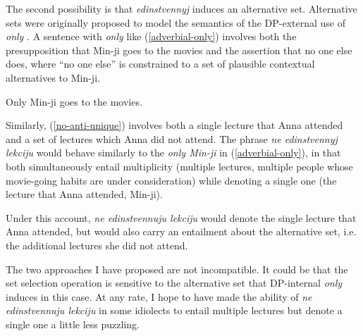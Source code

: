 The second possibility is that \textit{edinstvennyj} induces an alternative set. Alternative sets were originally proposed to model the semantics of the DP-external use of \textit{only} \citep{rooth85, rooth92}.
A sentence with \textit{only} like (\ref{adverbial-only}) involves both the presupposition that Min-ji goes to the movies and the assertion that no one else does, where ``no one else'' is constrained to a set of plausible contextual alternatives to Min-ji.

\begin{exe}
	\ex \label{adverbial-only} Only Min-ji goes to the movies.
\end{exe}

Similarly, (\ref{no-anti-unique}) involves both a single lecture that Anna attended and a set of lectures which Anna did not attend. The phrase \textit{ne edinstvennyj lekciju} would behave similarly to the \textit{only Min-ji} in (\ref{adverbial-only}), in that both simultaneously entail multiplicity (multiple lectures, multiple people whose movie-going habits are under consideration) while denoting a single one (the lecture that Anna attended, Min-ji).

Under this account, \textit{ne edinstvennuju lekciju} would denote the single lecture that Anna attended, but would also carry an entailment about the alternative set, i.e. the additional lectures she did not attend.

The two approaches I have proposed are not incompatible. It could be that the set selection operation is sensitive to the alternative set that DP-internal \textit{only} induces in this case. At any rate, I hope to have made the ability of \textit{ne edinstvennuju lekciju} in some idiolects to entail multiple lectures but denote a single one a little less puzzling.
